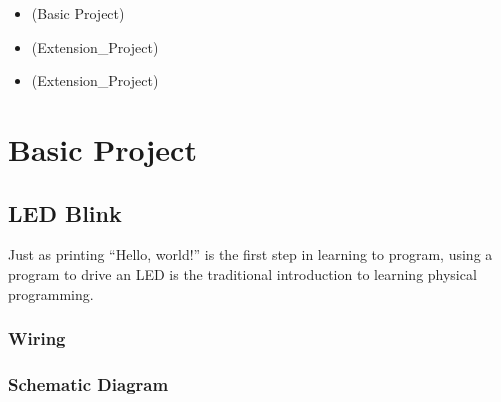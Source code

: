 \documentclass[a4paper,11pt,english]{sphinxmanual}
\begin{document}
\sphinxAtStartPar
{}
\begin{itemize}
\item {} 
\sphinxAtStartPar
{\hyperref[\detokenize{Basic_Project/0.96_inch_OLED:basic-0-96-inch-oled}]{}} (Basic Project)

\item {} 
\sphinxAtStartPar
{\hyperref[\detokenize{Extension_Project/Ping-Pong_Game:ext-ping-pong-game}]{}} (Extension\_Project)

\item {} 
\sphinxAtStartPar
{\hyperref[\detokenize{Extension_Project/Real-time_Weather_OLED:ext-real-time-weather-oled}]{}} (Extension\_Project)

\end{itemize}

\sphinxstepscope


\chapter{Basic Project}
\label{\detokenize{Basic_Project/Basic_Project:basic-project}}\label{\detokenize{Basic_Project/Basic_Project::doc}}
\sphinxstepscope


\section{LED Blink}
\label{\detokenize{Basic_Project/LED_Blink:led-blink}}\label{\detokenize{Basic_Project/LED_Blink:basic-led-blink}}\label{\detokenize{Basic_Project/LED_Blink::doc}}
\sphinxAtStartPar
Just as printing “Hello, world!” is the first step in learning to program, using a program to drive an LED is the traditional introduction to learning physical programming.


\subsection{Wiring}
\label{\detokenize{Basic_Project/LED_Blink:wiring}}


\subsection{Schematic Diagram}
\label{\detokenize{Basic_Project/LED_Blink:schematic-diagram}}
\end{document}
